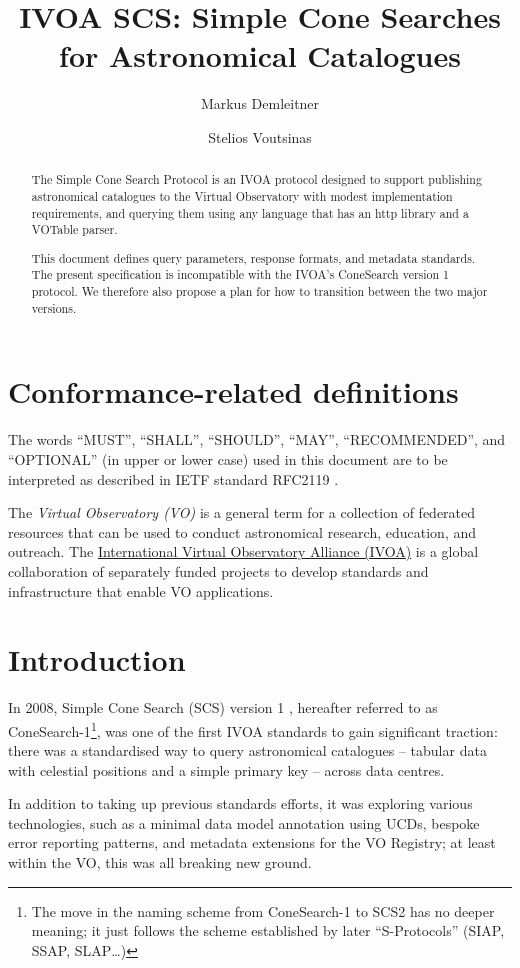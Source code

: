 \documentclass[11pt,a4paper]{ivoa}
\title{IVOA SCS: Simple Cone Searches for Astronomical Catalogues}
\author[https://wiki.ivoa.net/twiki/bin/view/IVOA/MarkusDemleitner]{
  Markus Demleitner}
\author{Stelios Voutsinas}
\begin{document}
\begin{abstract}
The Simple Cone Search Protocol is an IVOA protocol designed to support
publishing astronomical catalogues to the Virtual Observatory with
modest implementation requirements, and querying them using any language
that has an http library and a VOTable parser.

This document defines query parameters, response formats, and metadata
standards.  The present specification is incompatible with the IVOA's
ConeSearch version 1 protocol.  We therefore also propose a plan for how
to transition between the two major versions.

\end{abstract}


\section*{Conformance-related definitions}

The words ``MUST'', ``SHALL'', ``SHOULD'', ``MAY'', ``RECOMMENDED'', and
``OPTIONAL'' (in upper or lower case) used in this document are to be
interpreted as described in IETF standard RFC2119 \citep{std:RFC2119}.

The \emph{Virtual Observatory (VO)} is a
general term for a collection of federated resources that can be used
to conduct astronomical research, education, and outreach.
The \href{https://www.ivoa.net}{International
Virtual Observatory Alliance (IVOA)} is a global
collaboration of separately funded projects to develop standards and
infrastructure that enable VO applications.


\section{Introduction}

In 2008, Simple Cone Search (SCS) version 1 \citep{2008ivoa.specQ0222P},
hereafter referred to as ConeSearch-1\footnote{The move in the naming
scheme from ConeSearch-1 to SCS2 has no deeper meaning; it just follows
the scheme established by later ``S-Protocols'' (SIAP, SSAP, SLAP\dots)},
was one of the first IVOA standards to gain
significant traction: there was a standardised way to query astronomical
catalogues -- tabular data with celestial positions and a simple primary
key -- across data centres.

In addition to taking up previous standards efforts, it was exploring
various technologies, such as a minimal data model annotation using UCDs,
bespoke error reporting patterns, and metadata extensions for the VO
Registry; at least within the VO, this was all breaking new ground.
\end{document}
